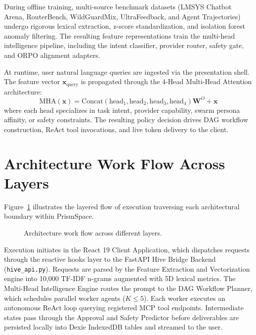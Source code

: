\documentclass[12pt,a4paper]{report}
\begin{document}
During offline training, multi-source benchmark datasets (LMSYS Chatbot Arena, RouterBench, WildGuardMix, UltraFeedback, and Agent Trajectories) undergo rigorous lexical extraction, z-score standardization, and isolation forest anomaly filtering. The resulting feature representations train the multi-head intelligence pipeline, including the intent classifier, provider router, safety gate, and ORPO alignment adapters.

At runtime, user natural language queries are ingested via the presentation shell. The feature vector $\mathbf{x}_{\text{query}}$ is propagated through the 4-Head Multi-Head Attention architecture:
\begin{equation}
    \mathrm{MHA}(\mathbf{x}) = \mathrm{Concat}(\mathrm{head}_1, \mathrm{head}_2, \mathrm{head}_3, \mathrm{head}_4)\mathbf{W}^O + \mathbf{x}
\end{equation}
where each head specializes in task intent, provider capability, swarm persona affinity, or safety constraints. The resulting policy decision drives DAG workflow construction, ReAct tool invocations, and live token delivery to the client.

\section{Architecture Work Flow Across Layers}
Figure~\ref{fig:arch_workflow} illustrates the layered flow of execution traversing each architectural boundary within PrismSpace.

\begin{figure}[H]
    \centering
    \caption{Architecture work flow across different layers.}
    \label{fig:arch_workflow}
\end{figure}

Execution initiates in the React 19 Client Application, which dispatches requests through the reactive hooks layer to the FastAPI Hive Bridge Backend (\texttt{hive\_api.py}). Requests are parsed by the Feature Extraction and Vectorization engine into 10,000 TF-IDF n-grams augmented with 5D lexical metrics. The Multi-Head Intelligence Engine routes the prompt to the DAG Workflow Planner, which schedules parallel worker agents ($K \le 5$). Each worker executes an autonomous ReAct loop querying registered MCP tool endpoints. Intermediate states pass through the Approval and Safety Predictor before deliverables are persisted locally into Dexie IndexedDB tables and streamed to the user.
\end{document}
